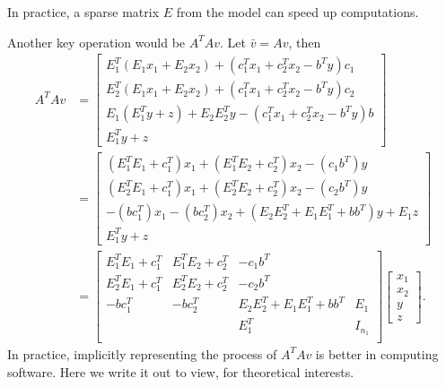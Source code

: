 \documentclass[12pt]{report}
\begin{document}
        In practice, a sparse matrix $E$ from the model can speed up computations. 
        \par
        Another key operation would be $A^TAv$. 
        Let $\bar v = Av$, then 
        \begin{align*}
            A^TAv &= 
            \begin{bmatrix}
                E^T_1(E_1x_1 + E_2x_2) + (c_1^Tx_1 + c_2^Tx_2 - b^Ty)c_1
                \\
                E^T_2(E_1x_1 + E_2x_2) + (c_1^Tx_1 + c_2^Tx_2 - b^Ty)c_2
                \\
                E_1(E_1^Ty + z) + E_2E_2^Ty - (c_1^Tx_1 + c_2^Tx_2 - b^Ty)b
                \\
                E_1^Ty + z
            \end{bmatrix}
            \\
            &= 
            \begin{bmatrix}
                (E_1^TE_1 + c_1^T)x_1 + (E_1^TE_2 + c_2^T)x_2 - (c_1b^T)y
                \\
                (E_2^TE_1 + c_1^T)x_1 + (E_2^TE_2 + c_2^T)x_2 - (c_2b^T)y
                \\
                -(bc_1^T)x_1 - (bc_2^T)x_2 + (E_2E_2^T + E_1E_1^T + bb^T)y
                + E_1z
                \\
                E_1^Ty + z
            \end{bmatrix}
            \\
            &= 
            \begin{bmatrix}
                E_1^TE_1 + c_1^T & E_1^TE_2 + c_2^T & -c_1b^T & \\
                E_2^TE_1 + c_1^T & E_2^TE_2 + c_2^T & -c_2b^T & \\
                -bc_1^T& -bc_2^T & E_2E_2^T + E_1E_1^T + bb^T & E_1 \\
                & & E_1^T & I_{n_1}\\
            \end{bmatrix}
            \begin{bmatrix}
                x_1 \\ x_2 \\ y \\ z
            \end{bmatrix}. 
        \end{align*}
        In practice, implicitly representing the process of $A^TAv$ is better in computing software. 
        Here we write it out to view, for theoretical interests. 
\end{document}
